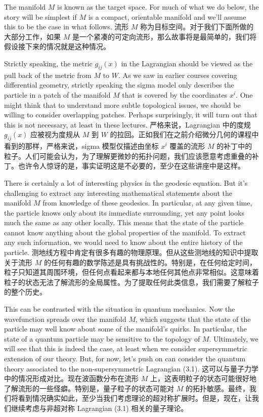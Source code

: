 \documentclass{article}
\begin{document}
\begin{paracol}{2}
The manifold $M$ is known as the target space. For much of what we do below, the story will be simplest if $M$ is a compact, orientable manifold and we’ll assume this to be the case in what follows.
\switchcolumn
流形 $M$ 称为目标空间。对于我们下面所做的大部分工作，如果 $M$ 是一个紧凑的可定向流形，那么故事将是最简单的，我们将假设接下来的情况就是这种情况。
\switchcolumn*

Strictly speaking, the metric $g_{ij}(x)$ in the Lagrangian should be viewed as the pull back of the metric from $M$ to $W$. As we saw in earlier courses covering diﬀerential geometry, strictly speaking the sigma model only describes the particle in a patch of the manifold $M$ that is covered by the coordinates $x^i$. One might think that to understand more subtle topological issues, we should be willing to consider overlapping patches. Perhaps surprisingly, it will turn out that this is not necessary, at least in these lectures.
\switchcolumn
严格来说，Lagrangian 中的度规 $g_{ij}(x)$ 应被视为度规从 $M$ 到 $W$ 的拉回。正如我们在之前介绍微分几何的课程中看到的那样，严格来说，sigma 模型仅描述由坐标 $x^i$ 覆盖的流形 $M$ 的补丁中的粒子。人们可能会认为，为了理解更微妙的拓扑问题，我们应该愿意考虑重叠的补丁。也许令人惊讶的是，事实证明这是不必要的，至少在这些讲座中是这样。
\switchcolumn*

There is certainly a lot of interesting physics in the geodesic equation. But it's challenging to extract any interesting mathematical statements about the manifold $M$ from knowledge of these geodesics. In particular, at any given time, the particle knows only about its immediate surrounding, yet any point looks much the same as any other locally. This means that the state of the particle cannot know anything about the global properties of the manifold. To extract any such information, we would need to know about the entire history of the particle.
\switchcolumn
测地线方程中肯定有很多有趣的物理原理。但从这些测地线的知识中提取关于流形 $M$ 的任何有趣的数学陈述是具有挑战性的。特别是，在任何给定时间，粒子只知道其周围环境，但任何点看起来都与本地任何其他点非常相似。这意味着粒子的状态无法了解流形的全局属性。为了提取任何此类信息，我们需要了解粒子的整个历史。
\switchcolumn*

This can be contrasted with the situation in quantum mechanics. Now the wavefunction spreads over the manifold $M$, which suggests that the state of the particle may well know about some of the manifold’s quirks. In particular, the state of a quantum particle may be sensitive to the topology of $M$. Ultimately, we will see that this is indeed the case, at least when we consider supersymmetric extension of our theory. But, for now, let’s push on can consider the quantum theory associated to the non-supersymmetric Lagrangian (3.1).
\switchcolumn
这可以与量子力学中的情况形成对比。现在波函数分布在流形 $M$ 上，这表明粒子的状态可能很好地了解流形的一些怪癖。特别是，量子粒子的状态可能对 $M$ 的拓扑敏感。最终，我们将看到情况确实如此，至少当我们考虑理论的超对称扩展时。但是，现在，让我们继续考虑与非超对称 Lagrangian (3.1) 相关的量子理论。
\switchcolumn*


\end{paracol}
\end{document}
